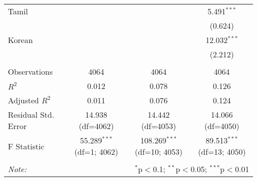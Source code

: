 \begin{table}[!htbp]
\begin{tabular}{@{\extracolsep{5pt}}lccc}
 Tamil & & & 5.491$^{***}$ \\
& & & (0.624) \\
 Korean & & & 12.032$^{***}$ \\
& & & (2.212) \\
\hline \\[-1.8ex]
 Observations & 4064 & 4064 & 4064 \\
 $R^2$ & 0.012 & 0.078 & 0.126 \\
 Adjusted $R^2$ & 0.011 & 0.076 & 0.124 \\
 Residual Std. Error & 14.938 (df=4062) & 14.442 (df=4053) & 14.066 (df=4050) \\
 F Statistic & 55.289$^{***}$ (df=1; 4062) & 108.269$^{***}$ (df=10; 4053) & 89.513$^{***}$ (df=13; 4050) \\
\hline
\hline \\[-1.8ex]
\textit{Note:} & \multicolumn{3}{r}{$^{*}$p$<$0.1; $^{**}$p$<$0.05; $^{***}$p$<$0.01} \\
\end{tabular}
\end{table}